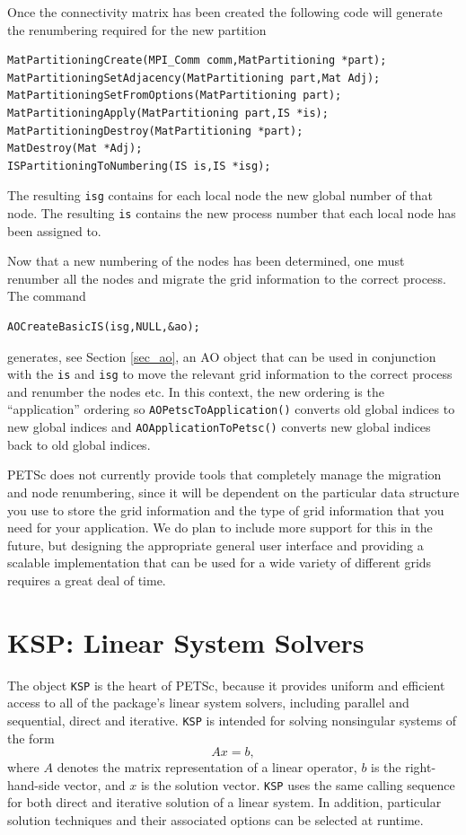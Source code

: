 Once the connectivity matrix has been created the following code will
generate the renumbering required for the new partition
\begin{lstlisting}
MatPartitioningCreate(MPI_Comm comm,MatPartitioning *part);
MatPartitioningSetAdjacency(MatPartitioning part,Mat Adj);
MatPartitioningSetFromOptions(MatPartitioning part);
MatPartitioningApply(MatPartitioning part,IS *is);
MatPartitioningDestroy(MatPartitioning *part); 
MatDestroy(Mat *Adj);
ISPartitioningToNumbering(IS is,IS *isg);
\end{lstlisting}
The resulting \lstinline{isg} contains for each local node the new global
number of that node. The resulting \lstinline{is} contains the new process number
that each local node has been assigned to.

Now that a new numbering of the nodes has been determined, one must
renumber all the nodes and migrate the grid information to the correct process.
The command
\begin{lstlisting}
AOCreateBasicIS(isg,NULL,&ao);
\end{lstlisting}
generates, see Section \ref{sec_ao}, an AO object that can be used in conjunction with the
\lstinline{is} and \lstinline{isg} to move the relevant grid information to the correct process
and renumber the nodes etc.
In this context, the new ordering is the ``application'' ordering so \lstinline{AOPetscToApplication()}
converts old global indices to new global indices and \lstinline{AOApplicationToPetsc()} converts new
global indices back to old global indices.

PETSc does not currently provide tools that completely manage the migration and
node renumbering, since it will be dependent on the particular data structure you
use to store the grid information and the type of grid information that you need
for your application. We do plan to include more support for this in the future,
but designing the appropriate general user interface and providing a scalable
implementation that can be used for a wide variety of different grids requires a
great deal of time.


\cleardoublepage
\chapter{KSP: Linear System Solvers} 
\label{ch_ksp}

The object \lstinline{KSP} is the heart of PETSc, because it provides uniform and efficient access
to all of the package's linear system solvers, including parallel and sequential,
direct and iterative.
\lstinline{KSP} is intended for solving nonsingular systems of the form
\begin{equation}
 A x = b,
\label{eq_Ax=b}
\end{equation}
where $A$ denotes the matrix representation of a linear operator, $b$
is the right-hand-side vector, and $ x $ is the solution vector.  \lstinline{KSP}
uses the same calling sequence for both direct and iterative solution
of a linear system.  In addition, particular solution techniques and
their associated options can be selected at runtime.

